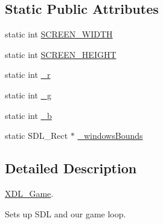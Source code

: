 \subsection*{Static Public Attributes}
\begin{DoxyCompactItemize}
\item 
static int \hyperlink{class_x_d_l___game_a2168cd95816117ff5f905692439aeb72}{S\-C\-R\-E\-E\-N\-\_\-\-W\-I\-D\-T\-H}
\item 
static int \hyperlink{class_x_d_l___game_a9fde7fa33a7816a1e3f17313ebca9001}{S\-C\-R\-E\-E\-N\-\_\-\-H\-E\-I\-G\-H\-T}
\item 
static int \hyperlink{class_x_d_l___game_a0c6b24dee1668f4a1079d389efda2ccf}{\-\_\-r}
\item 
static int \hyperlink{class_x_d_l___game_a0d18c646bd050e6e5bf93efd1b00a8a8}{\-\_\-g}
\item 
static int \hyperlink{class_x_d_l___game_a2d89ed8221d33e4a4351c93d4190464c}{\-\_\-b}
\item 
static S\-D\-L\-\_\-\-Rect $\ast$ \hyperlink{class_x_d_l___game_aba18e8d33ee6e87494ebb958f2beee67}{\-\_\-windows\-Bounds}
\end{DoxyCompactItemize}


\subsection{Detailed Description}
\hyperlink{class_x_d_l___game}{X\-D\-L\-\_\-\-Game}. 

Sets up S\-D\-L and our game loop. 

